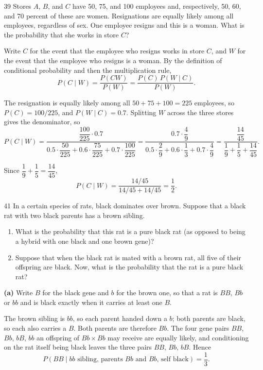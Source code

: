 \documentclass[11pt]{article}
\begin{document}
\begin{problem}{39}
  Stores $A$, $B$, and $C$ have 50, 75, and 100 employees and, respectively, 50,
  60, and 70 percent of these are women. Resignations are equally likely among
  all employees, regardless of sex. One employee resigns and this is a woman.
  What is the probability that she works in store $C$?
\end{problem}
Write $C$ for the event that the employee who resigns works in store $C$, and
$W$ for the event that the employee who resigns is a woman. By the definition of
conditional probability and then the multiplication rule,
\[
  P(C \mid W)
    = \frac{P(C W)}{P(W)}
    = \frac{P(C)\, P(W \mid C)}{P(W)} .
\]

The resignation is equally likely among all $50 + 75 + 100 = 225$ employees, so
$P(C) = 100/225$, and $P(W \mid C) = 0.7$. Splitting $W$ across the three stores
gives the denominator, so
\[
  P(C \mid W)
    = \frac{\dfrac{100}{225} \cdot 0.7}
           {0.5 \cdot \dfrac{50}{225}
            + 0.6 \cdot \dfrac{75}{225}
            + 0.7 \cdot \dfrac{100}{225}}
    = \frac{0.7 \cdot \dfrac{4}{9}}
           {0.5 \cdot \dfrac{2}{9} + 0.6 \cdot \dfrac{1}{3} + 0.7 \cdot \dfrac{4}{9}}
    = \frac{\dfrac{14}{45}}{\dfrac{1}{9} + \dfrac{1}{5} + \dfrac{14}{45}} .
\]

Since $\dfrac{1}{9} + \dfrac{1}{5} = \dfrac{14}{45}$,
\[
  P(C \mid W)
    = \frac{14/45}{14/45 + 14/45}
    = \frac{1}{2} .
\]

\begin{problem}{41}
  In a certain species of rats, black dominates over brown. Suppose that a black
  rat with two black parents has a brown sibling.
  \begin{enumerate}
    \item[(a)] What is the probability that this rat is a pure black rat (as
      opposed to being a hybrid with one black and one brown gene)?
    \item[(b)] Suppose that when the black rat is mated with a brown rat, all
      five of their offspring are black. Now, what is the probability that the
      rat is a pure black rat?
  \end{enumerate}
\end{problem}
\textbf{(a)} Write $B$ for the black gene and $b$ for the brown one, so that a
rat is $BB$, $Bb$ or $bb$ and is black exactly when it carries at least one $B$.

The brown sibling is $bb$, so each parent handed down a $b$; both parents are
black, so each also carries a $B$. Both parents are therefore $Bb$. The four
gene pairs $BB$, $Bb$, $bB$, $bb$ an offspring of $Bb \times Bb$ may receive are
equally likely, and conditioning on the rat itself being black leaves the three
pairs $BB$, $Bb$, $bB$. Hence
\[
  P(BB \mid \text{$bb$ sibling, parents $Bb$ and $Bb$, self black})
    = \frac{1}{3} .
\]
\end{document}

